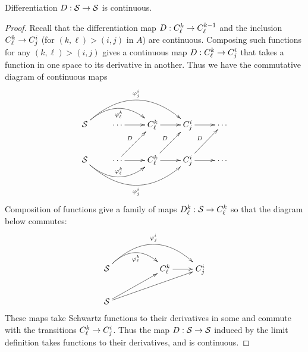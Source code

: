       \begin{claim}
        Differentiation $D:\S\rightarrow\S$ is continuous.
        \begin{proof}
          Recall that the differentiation map $D:\Ckl\rightarrow\Ckml$ and the inclusion $\Ckl\rightarrow\Cij$ (for $(k,\ell)>(i,j)$ in $A$) are continuous.
           Composing such functions for any $(k,\ell)>(i,j)$ gives a continuous map $D:\Ckl\rightarrow\Cij$ that takes a function in one space to its derivative in another.
          Thus we have the commutative diagram of continuous maps
          \begin{displaymath}
            \xymatrix{
              \S \ar@/^20pt/[rr]_{\varphi^k_\ell} \ar@/^30pt/[rrr]^{\varphi^i_j} & \cdots \ar[r] & \Ckl \ar[r] & \Cij \ar[r] & \cdots \\
              \S \ar@/_20pt/[rr]^{\varphi^k_\ell} \ar@/_30pt/[rrr]_{\varphi^i_j} & \cdots \ar[r] \ar[ur]^D & \Ckl \ar[r] \ar[ur]^D & \Cij \ar[r] \ar[ur]^D & \cdots\\
            }
          \end{displaymath}
          Composition of functions give a family of maps $D^k_\ell:\S\rightarrow\Ckl$ so that the diagram below commutes:
          \begin{displaymath}
            \xymatrix{
              \S \ar@/^20pt/[rr]_{\varphi^k_\ell} \ar@/^30pt/[rrr]^{\varphi^i_j} && \Ckl \ar[r] & \Cij \\
              \S \ar[urr] \ar[urrr] \\
            }
          \end{displaymath}
          These maps take Schwartz functions to their derivatives in some \Ckl and commute with the transitions $\Ckl\rightarrow\Cij$.
          Thus the map $D:\S\rightarrow\S$ induced by the limit definition takes functions to their derivatives, and is continuous.
        \end{proof}
      \end{claim}


